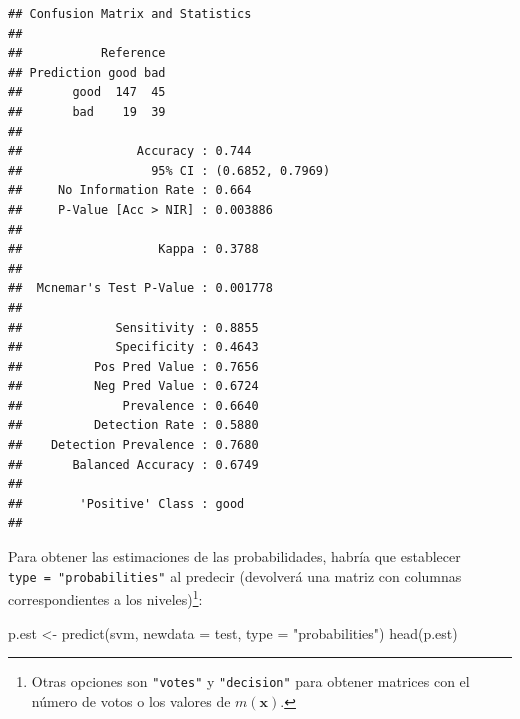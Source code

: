 \documentclass[
]{book}
\newenvironment{Shaded}{\begin{snugshade}}{\end{snugshade}}
\newcommand{\AttributeTok}[1]{\textcolor[rgb]{0.77,0.63,0.00}{#1}}
\newcommand{\FunctionTok}[1]{\textcolor[rgb]{0.00,0.00,0.00}{#1}}
\newcommand{\NormalTok}[1]{#1}
\newcommand{\OtherTok}[1]{\textcolor[rgb]{0.56,0.35,0.01}{#1}}
\newcommand{\SpecialCharTok}[1]{\textcolor[rgb]{0.00,0.00,0.00}{#1}}
\newcommand{\StringTok}[1]{\textcolor[rgb]{0.31,0.60,0.02}{#1}}
\theoremstyle{break}
\theoremstyle{definition}
\theoremstyle{definition}
\theoremstyle{definition}
\theoremstyle{definition}
\theoremstyle{remark}
\begin{document}
\begin{Shaded}
\end{Shaded}

\begin{verbatim}
## Confusion Matrix and Statistics
## 
##           Reference
## Prediction good bad
##       good  147  45
##       bad    19  39
##                                           
##                Accuracy : 0.744           
##                  95% CI : (0.6852, 0.7969)
##     No Information Rate : 0.664           
##     P-Value [Acc > NIR] : 0.003886        
##                                           
##                   Kappa : 0.3788          
##                                           
##  Mcnemar's Test P-Value : 0.001778        
##                                           
##             Sensitivity : 0.8855          
##             Specificity : 0.4643          
##          Pos Pred Value : 0.7656          
##          Neg Pred Value : 0.6724          
##              Prevalence : 0.6640          
##          Detection Rate : 0.5880          
##    Detection Prevalence : 0.7680          
##       Balanced Accuracy : 0.6749          
##                                           
##        'Positive' Class : good            
## 
\end{verbatim}

Para obtener las estimaciones de las probabilidades, habría que establecer
\texttt{type\ =\ "probabilities"} al predecir (devolverá una matriz con columnas
correspondientes a los niveles)\footnote{Otras opciones son \texttt{"votes"} y \texttt{"decision"} para obtener matrices con el número de votos o los valores de \(m(\mathbf{x})\).}:

\begin{Shaded}
\begin{Highlighting}[]
\NormalTok{p.est }\OtherTok{\textless{}{-}} \FunctionTok{predict}\NormalTok{(svm, }\AttributeTok{newdata =}\NormalTok{ test, }\AttributeTok{type =} \StringTok{"probabilities"}\NormalTok{)}
\FunctionTok{head}\NormalTok{(p.est)}
\end{Highlighting}
\end{Shaded}
\end{document}
